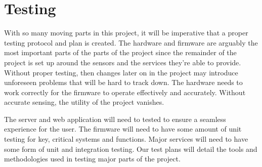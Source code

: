 \section{Testing}
With so many moving parts in this project, it will be imperative that a proper
testing protocol and plan is created. The hardware and firmware are arguably the
most important parts of the parts of the project since the remainder of the
project is set up around the sensors and the services they're able to provide.
Without proper testing, then changes later on in the project may introduce
unforeseen problems that will be hard to track down. The hardware needs to work
correctly for the firmware to operate effectively and accurately. Without
accurate sensing, the utility of the project vanishes. 

The server and web
application will need to tested to ensure a seamless experience for the user.
The firmware will need to have some amount of unit testing for key, critical
systems and functions. Major services will need to have some form of unit and
integration testing. Our test plans will detail the tools and methodologies used
in testing major parts of the project.

